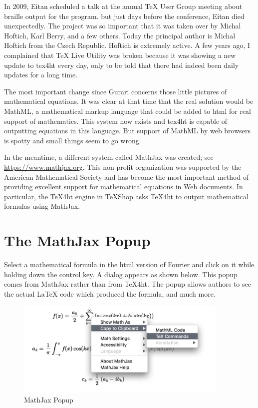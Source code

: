 \documentclass[11pt, oneside]{article}   	%
\begin{document}
In 2009, Eitan scheduled a talk at the annual TeX User Group meeting about  braille output
for the program. but just days before the conference, Eitan died unexpectedly. The project was so important that it was taken over by Michal Hoftich, Karl Berry, and a few others.  Today the principal author is
Michal Hoftich from the Czech Republic.  Hoftich is extremely active. A few years ago, I complained
that TeX Live Utility was broken because it was showing a new update to tex4ht every day, only to be
told that there had indeed been daily updates for a long time.

The most important change since Gurari concerns those little pictures of mathematical equations. It was clear at that time that the real solution would be MathML, a mathematical markup language that could be added to html for real support of mathematics. This system now exists and tex4ht is capable of outputting
equations in this language. But support of MathML by web browsers is spotty and small things seem to go wrong. 

In the meantime, a different system called MathJax was created; see \url{https://www.mathjax.org}. This
non-profit organization was supported by the American Mathematical Society and has become the
most important method of providing excellent support for mathematical equations in Web documents.
In particular, the TeX4ht engine in TeXShop asks TeX4ht to output mathematical formulas using MathJax.

\section{The MathJax Popup}

Select a mathematical formula in the html version of Fourier and click on it while holding down
the control key. A dialog appears as shown below. This popup comes from MathJax rather than
from TeX4ht. The popup allows authors to see the actual LaTeX code which produced the formula,
and much more.

  \begin{figure}[htbp] %
     \centering
     \includegraphics[width=4in]{image7.png} 
     \caption{MathJax Popup}
     \label{fig:example}
  \end{figure}
\end{document}
